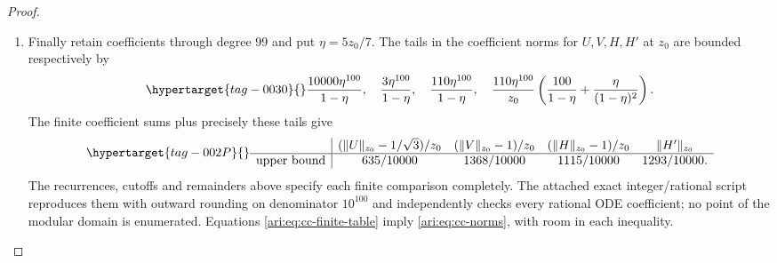 \begin{proof}
\begin{enumerate}[label=\arabic*.,leftmargin=*]
\item Finally retain coefficients through degree 99 and put
$\eta=5z_0/7$. The tails in the coefficient norms for
$U,V,H,H'$ at $z_0$ are bounded respectively by
\begin{equation}\hypertarget{tag-0030}{}\label{ari:eq:cc-tail100}
 \frac{10000\eta^{100}}{1-\eta},\quad
 \frac{3\eta^{100}}{1-\eta},\quad
 \frac{110\eta^{100}}{1-\eta},\quad
 \frac{110\eta^{100}}{z_0}
 \left(\frac{100}{1-\eta}+\frac{\eta}{(1-\eta)^2}\right).
\end{equation}
The finite coefficient sums plus precisely these tails give
\begin{equation}\hypertarget{tag-002P}{}\label{ari:eq:cc-finite-table}
 \begin{array}{c|cccc}
 & (\|U\|_{z_0}-1/\sqrt3)/z_0
 & (\|V\|_{z_0}-1)/z_0
 & (\|H\|_{z_0}-1)/z_0 & \|H'\|_{z_0}\\ \hline
 \text{upper bound}&635/10000&1368/10000&1115/10000&1293/10000.
 \end{array}
\end{equation}
The recurrences, cutoffs and remainders above specify each finite
comparison completely. The attached exact integer/rational
script reproduces them with outward rounding on denominator
$10^{100}$ and independently checks every rational ODE
coefficient; no point of the modular domain is enumerated.
Equations \eqref{ari:eq:cc-finite-table} imply
\eqref{ari:eq:cc-norms}, with room in each inequality.


\end{enumerate}
\end{proof}
